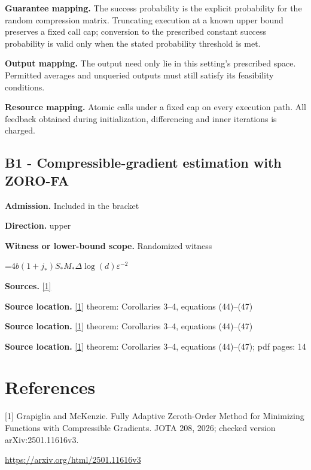 \documentclass[10pt,a4paper]{article}
\newcommand{\AtlasMath}[1]{\par\begingroup\centering\setbox0=\hbox{$\displaystyle #1$}\ifdim\wd0>1.4\linewidth\typeout{ATLAS WIDE FORMULA: \the\wd0}\fi\ifdim\wd0>\linewidth\resizebox{\linewidth}{!}{\box0}\else\box0\fi\par\endgroup}
\begin{document}
\textbf{Guarantee mapping.} The success probability is the explicit probability for the random compression matrix. Truncating execution at a known upper bound preserves a fixed call cap; conversion to the prescribed constant success probability is valid only when the stated probability threshold is met.

\textbf{Output mapping.} The output need only lie in this setting's prescribed space. Permitted averages and unqueried outputs must still satisfy its feasibility conditions.

\textbf{Resource mapping.} Atomic calls under a fixed cap on every execution path. All feedback obtained during initialization, differencing and inner iterations is charged.

\subsection{B1 - Compressible-gradient estimation with ZORO-FA}
\textbf{Admission.} Included in the bracket

\textbf{Direction.} upper

\textbf{Witness or lower-bound scope.} Randomized witness

\AtlasMath{4b(1+j_*)S_*M_*\Delta\log(d)\varepsilon^{-2}}
\textbf{Sources.} \href{https://arxiv.org/html/2501.11616v3}{[1]}

\textbf{Source location.} \href{https://arxiv.org/html/2501.11616v3}{[1]} theorem: Corollaries 3--4, equations (44)--(47)

\textbf{Source location.} \href{https://arxiv.org/html/2501.11616v3}{[1]} theorem: Corollaries 3--4, equations (44)--(47)

\textbf{Source location.} \href{https://arxiv.org/html/2501.11616v3}{[1]} theorem: Corollaries 3--4, equations (44)--(47); pdf pages: 14

\section{References}
[1] Grapiglia and McKenzie. Fully Adaptive Zeroth-Order Method for Minimizing Functions with Compressible Gradients. JOTA 208, 2026; checked version arXiv:2501.11616v3.

\url{https://arxiv.org/html/2501.11616v3}
\end{document}
